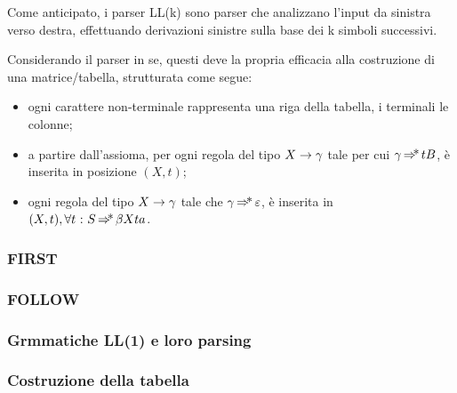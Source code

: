 \documentclass{subfiles}
\begin{document}
Come anticipato, i parser LL(k) sono parser che analizzano l'input da sinistra verso destra,
effettuando derivazioni sinistre sulla base dei k simboli successivi.

Considerando il parser in se, questi deve la propria efficacia alla costruzione di una matrice/tabella, strutturata come segue:
\begin{itemize}
    \item ogni carattere non-terminale rappresenta una riga della tabella, i terminali le colonne;
    \item a partire dall'assioma, per ogni regola del tipo $\Grammar{X}{\gamma}$ tale per cui $\gamma \operatorname{\Rightarrow\hspace{-5pt}*} tB$,
          è inserita in posizione $(X, t)$;

    \item ogni regola del tipo $\Grammar{X}{\gamma}$ tale che $\gamma \operatorname{\Rightarrow\hspace{-5pt}*} \varepsilon$,
          è inserita in $(X, t), \forall t \operatorname{\, : \,} S \operatorname{\Rightarrow\hspace{-5pt}*} \beta X t a$.
\end{itemize}

\subsubsection{FIRST}

\clearpage
\subsubsection{FOLLOW}


\subsubsection{Grmmatiche LL(1) e loro parsing}


\subsubsection{Costruzione della tabella}

\end{document}
